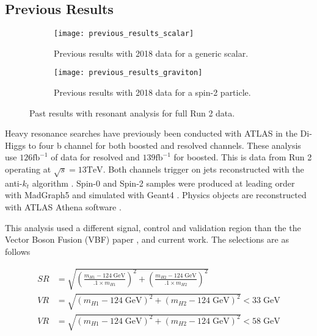 \documentclass[12pt]{article}
\newcommand{\un}[1]{\;\text{#1}}
\begin{document}
\subsection{Previous Results}
\begin{figure}[t]
    \centering
    \begin{subfigure}[t]{.48\textwidth}
        \centering
        \texttt{[image: previous\_results\_scalar]}
        \caption{Previous results with 2018 data for a generic scalar.}
        \label{subfig:previous_results_scalar}
    \end{subfigure}
    \hfill
    \begin{subfigure}[t]{.48\textwidth}
        \centering
        \texttt{[image: previous\_results\_graviton]}
        \caption{Previous results with 2018 data for a spin-2 particle.}
        \label{subfig:previous_results_graviton}
    \end{subfigure}
\caption{Past results with resonant analysis for full Run 2 data.}
\label{fig:previous_results}
\end{figure}

Heavy resonance searches have previously been conducted with ATLAS in the Di-Higgs
to four b channel for both boosted and resolved channels. These analysis use
$126 \text{fb}^{-1}$ of data for resolved and $139\text{fb}^{-1}$ for boosted.
This is data from Run 2 operating at $\sqrt{s}=13\text{TeV}$. Both channels
trigger on jets reconstructed with the anti-$k_t$ algorithm \cite{antikt}.
Spin-0 and Spin-2 samples were produced at leading order with MadGraph5
\cite{madgraph5_OG} and simulated with Geant4 \cite{geant4}. Physics objects are
reconstructed with ATLAS Athena software \cite{atlas_simulation}.

This analysis used a different signal, control and validation region than the
the Vector Boson Fusion (VBF) paper \cite{atlas_hhbbbb_vbf}, and current work. The
selections are as follows

\begin{align}
    SR &= \sqrt{\left( \frac{m_{H1} - 124\un{GeV}}{.1\times m_{H1} } \right)^2 +
    \left( \frac{m_{H2} - 124\un{GeV}}{.1\times m_{H2}} \right)^2} \\
    VR &= \sqrt{\left( m_{H1} - 124\un{GeV} \right)^2 + \left( m_{H2} -
    124\un{GeV} \right)^2} < 33\un{GeV} \\
    VR &= \sqrt{\left( m_{H1} - 124\un{GeV} \right)^2 + \left( m_{H2} -
    124\un{GeV} \right)^2} < 58\un{GeV}
\end{align}
\end{document}
